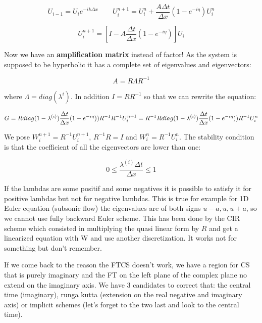 \begin{equation}
U_{i-1} = U_i e^{-i k \Delta x} \qquad U_i^{n+1} = U_i^n + \frac{A \Delta t}{\Delta x} (1 - e^{-i\eta}) U_i^n 
\end{equation}

\begin{equation}
U_i^{n+1} = [I - A \frac{\Delta t}{\Delta x} (1 - e^{-i\eta})] U_i
\end{equation}

Now we have an \textbf{amplification matrix} instead of factor! As the system is supposed to be hyperbolic it has a complete set of eigenvalues and eigenvectors: 

\begin{equation}
A = R\Lambda R^{-1}
\end{equation}

where $\Lambda = diag (\lambda ^{i})$. In addition $I = RR^{-1}$ so that we can rewrite the equation: 

\begin{equation}
G = R diag (1 - \lambda ^{(i)})\frac{\Delta t}{\Delta x} (1-e^{-i\eta})) R^{-1}\\
R^{-1}U_i^{n+1} = R^{-1}R diag (1 - \lambda ^{(i)}) \frac{\Delta t}{\Delta x} (1-e^{-i \eta}) ) R^{-1}U_i^n
\end{equation}

We pose $W_i^{n+1} = R^{-1}U_i^{n+1}$, $R^{-1}R = I$ and $W_i^{n} = R^{-1}U_i^{n}$. The stability condition is that the coefficient of all the eigenvectors are lower than one: 

\begin{equation}
0 \leq \frac{\lambda ^{(i)}\Delta t}{\Delta x} \leq 1
\end{equation}

If the lambdas are some positif and some negatives it is possible to satisfy it for positive lambdas but not for negative lambdas. This is true for example for 1D Euler equation (subsonic flow) the eigenvalues are of both signs $u-a, u, u+a$, so we cannot use fully backward Euler scheme. This has been done by the CIR scheme which consisted in multiplying the quasi linear form by $R$ and get a linearized equation with W and use another discretization. It works not for something but don't remember. 

If we come back to the reason the FTCS doesn't work, we have a region for CS that is purely imaginary and the FT on the left plane of the complex plane no extend on the imaginary axis. We have 3 candidates to correct that: the central time (imaginary), runga kutta (extension on the real negative and imaginary axis) or implicit schemes (let's forget to the two last and look to the central time). 

